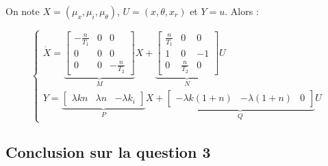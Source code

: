 \documentclass[10pt]{article}
\begin{document}
\vspace{10px}

\noindent On note $X = (\mu_x, \mu_i, \mu_\theta)$, $U = (x, \theta, x_r)$ et $Y = u$. Alors :

\[
	\begin{cases}
		\dot X =
		\underbrace{
		\begin{bmatrix}
			- \frac{n}{T_1} & 0 & 0 \\
			0 & 0 & 0 \\
			0 & 0 & - \frac{n}{T_2}
		\end{bmatrix}
		}_{M} X +
		\underbrace{
		\begin{bmatrix}
			\frac{n}{T_1} & 0 & 0 \\
			1 & 0 & -1 \\
			0 & \frac{n}{T_2} & 0
		\end{bmatrix}
		}_{N} U \\
		Y = \underbrace{
		\begin{bmatrix}
			\lambda k n & \lambda n & - \lambda k_i
		\end{bmatrix}
		}_{P} X +
		\underbrace{
		\begin{bmatrix}
			- \lambda k (1 + n) &- \lambda (1 + n) & 0
		\end{bmatrix}
		}_{Q} U
	\end{cases}
\]

\subsection*{Conclusion sur la question 3}

\end{document}
